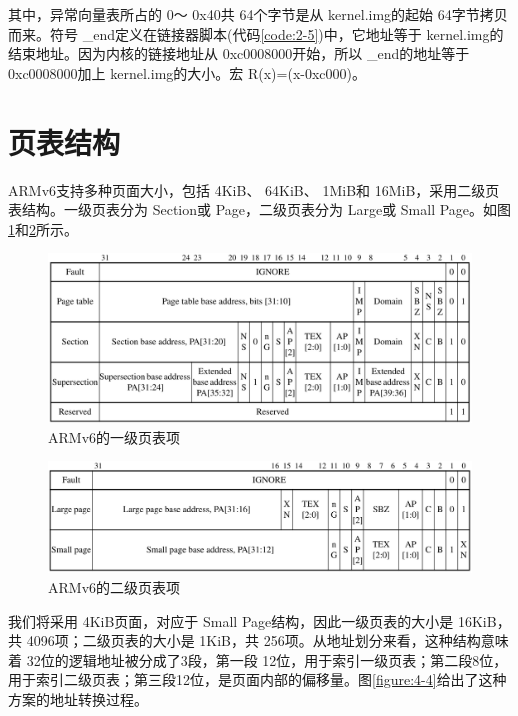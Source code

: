 \documentclass[main.tex]{subfiles}
\begin{document}
\begin{CJK*}{UTF8}{song}
\noindent
其中，异常向量表所占的 0～ 0x40共 64个字节是从 kernel.img的起始 64字节拷贝而来。符号 \_end定义在链接器脚本(代码\ref{code:2-5})中，它地址等于 kernel.img的结束地址。因为内核的链接地址从 0xc000\-8000开始，所以 \_end的地址等于 0xc000\-8000加上 kernel.img的大小。宏 R(x)=(x-0xc000)。

\section{页表结构}
 ARMv6支持多种页面大小，包括 4\-KiB、 64\-KiB、 1\-MiB和 16\-MiB，采用二级页表结构。一级页表分为 Section或 Page，二级页表分为 Large或 Small Page。如图\ref{figure:4-2}和\ref{figure:4-3}所示。

\begin{figure}[htp]
\centering
\includegraphics[scale=0.3]{figures/4-2}
\caption{ARMv6的一级页表项}
\label{figure:4-2}
\end{figure}

\begin{figure}[htp]
\centering
\includegraphics[scale=0.3]{figures/4-3}
\caption{ARMv6的二级页表项}
\label{figure:4-3}
\end{figure}

我们将采用 4\-KiB页面，对应于 Small Page结构，因此一级页表的大小是 16\-KiB，共 4096项；二级页表的大小是 1\-KiB，共 256项。从地址划分来看，这种结构意味着 32位的逻辑地址被分成了3段，第一段 12位，用于索引一级页表；第二段8位，用于索引二级页表；第三段12位，是页面内部的偏移量。图\ref{figure:4-4}给出了这种方案的地址转换过程。


\end{CJK*}
\end{document}
